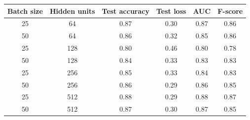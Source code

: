 \documentclass[11pt,a4paper,oneside]{article}
\begin{document}
\begin{center}
\begin{tabular}{|cccccc|}
\hline
Batch size & Hidden units & Test accuracy & Test loss & AUC & F-score \\
\hline
25 & 64 & 0.87 & 0.30 & 0.87 & 0.86 \\ 
50 & 64 & 0.86 & 0.32 & 0.85 & 0.86 \\ 
25 & 128 & 0.80 & 0.46 & 0.80 & 0.78 \\ 
50 & 128 & 0.84 & 0.33 & 0.83 & 0.83 \\ 
25 & 256 & 0.85 & 0.33 & 0.84 & 0.83 \\ 
50 & 256 & 0.86 & 0.29 & 0.86 & 0.85 \\ 
25 & 512 & 0.88 & 0.29 & 0.88 & 0.87 \\ 
50 & 512 & 0.87 & 0.30 & 0.87 & 0.85 \\
\hline
\end{tabular}
\end{center}
\end{document}
